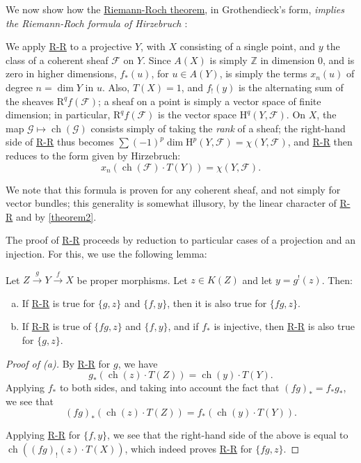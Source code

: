 \documentclass{article}
\theoremstyle{plain}
\newenvironment{lemma}[1]
    {\renewcommand\theinnercustomlemma{#1}\innercustomlemma}
    {\endinnercustomlemma}
\theoremstyle{definition}
\newcommand{\sh}[1]{{\mathscr{#1}}}
\newcommand{\HH}{\mathrm{H}}
\newcommand{\RR}{\mathrm{R}}
\DeclareMathOperator{\ch}{ch}
\newcommand{\oldpage}[1]{\marginpar{\footnotesize$\Big\vert$ \textit{p.~#1}}}
\begin{document}
We now show how the \hyperref[theoremriemannroch]{Riemann-Roch theorem}, in Grothendieck's form, \emph{implies the Riemann-Roch formula of Hirzebruch \cite{9}}:

We apply \hyperref[theoremriemannroch]{R-R} to a projective $Y$, with $X$ consisting of a single point, and $y$ the class of a coherent sheaf $\sh{F}$ on $Y$.
Since $A(X)$ is simply $\mathbb{Z}$ in dimension $0$, and is zero in higher dimensions, $f_*(u)$, for $u\in A(Y)$, is simply the terms $x_n(u)$ of degree $n=\dim Y$ in $u$.
Also, $T(X)=1$, and $f_!(y)$ is the alternating sum of the sheaves $\RR^qf(\sh{F})$;
a sheaf on a point is simply a vector space of finite dimension;
in particular, $\RR^qf(\sh{F})$ is the vector space $\HH^q(Y,\sh{F})$.
On $X$, the map $\sh{G}\mapsto\ch(\sh{G})$ consists simply of taking the \emph{rank} of a sheaf;
the right-hand side of \hyperref[theoremriemannroch]{R-R} thus becomes $\sum(-1)^p\dim\HH^p(Y,\sh{F}) = \chi(Y,\sh{F})$, and \hyperref[theoremriemannroch]{R-R} then reduces to the form given by Hirzebruch:
\[
  x_n(\ch(\sh{F})\cdot T(Y)) = \chi(Y,\sh{F}).
\]

We note that this formula is proven for any coherent sheaf, and not simply for vector bundles;
this generality is somewhat illusory, by the linear character of \hyperref[theoremriemannroch]{R-R} and by \cref{theorem2}.

The proof of \hyperref[theoremriemannroch]{R-R} proceeds by reduction to particular cases of a projection and an injection.
For this, we use the following lemma:

\begin{lemma}{15}
\label{lemma15}
  Let $Z\xrightarrow{g}Y\xrightarrow{f}X$ be proper morphisms.
  Let $z\in K(Z)$ and let $y=g^!(z)$. Then:
  \begin{enumerate}[(a)]
    \item If \hyperref[theoremriemannroch]{R-R} is true for $\{g,z\}$ and $\{f,y\}$, then it is also true for $\{fg,z\}$.
    \item If \hyperref[theoremriemannroch]{R-R} is true of $\{fg,z\}$ and $\{f,y\}$, and if $f_*$ is injective, then \hyperref[theoremriemannroch]{R-R} is also true for $\{g,z\}$.
  \end{enumerate}
\end{lemma}

\begin{proof}[Proof of (a)]
  By \hyperref[theoremriemannroch]{R-R} for $g$, we have
  \[
    g_*(\ch(z)\cdot T(Z)) = \ch(y)\cdot T(Y).
  \]
  \oldpage{114}
  Applying $f_*$ to both sides, and taking into account the fact that $(fg)_*=f_*g_*$, we see that
  \[
    (fg)_*(\ch(z)\cdot T(Z)) = f_*(\ch(y)\cdot T(Y)).
  \]

  Applying \hyperref[theoremriemannroch]{R-R} for $\{f,y\}$, we see that the right-hand side of the above is equal to $\ch((fg)_!(z)\cdot T(X))$, which indeed proves \hyperref[theoremriemannroch]{R-R} for $\{fg,z\}$.
\end{proof}
\end{document}
